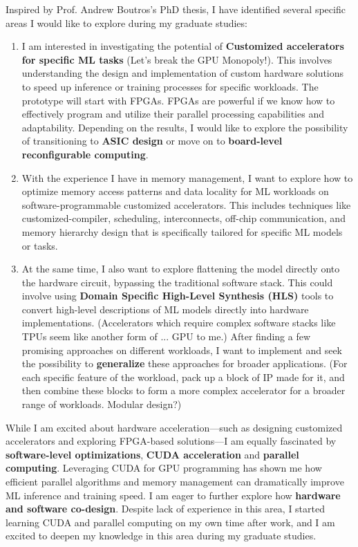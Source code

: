 \documentclass[a4 paper, 10pt]{article}
\begin{document}
Inspired by Prof. Andrew Boutros's PhD thesis, I have identified several specific areas I would like to explore during my graduate studies:
\begin{enumerate}
    \item I am interested in investigating the potential of \textbf{Customized accelerators for specific ML tasks} (Let's break the GPU Monopoly!). This involves understanding the design and implementation of {custom hardware solutions} to speed up inference or training processes for specific workloads. The prototype will start with {FPGAs}. FPGAs are powerful if we know how to effectively program and utilize their parallel processing capabilities and adaptability. Depending on the results, I would like to explore the possibility of transitioning to \textbf{ASIC design} or move on to \textbf{board-level reconfigurable computing}.
    \item With the experience I have in {memory management}, I want to explore how to optimize {memory access patterns} and {data locality} for ML workloads on software-programmable customized accelerators. This includes techniques like customized-compiler, scheduling, interconnects, off-chip communication, and memory hierarchy design that is specifically tailored for specific ML models or tasks.
    \item At the same time, I also want to explore flattening the model directly onto the {hardware circuit}, bypassing the traditional software stack. This could involve using \textbf{Domain Specific High-Level Synthesis (HLS)} tools to convert high-level descriptions of ML models directly into hardware implementations. (Accelerators which require complex software stacks like TPUs seem like another form of ... GPU to me.) After finding a few promising approaches on different workloads, I want to implement and seek the possibility to \textbf{generalize} these approaches for broader applications. (For each specific feature of the workload, pack up a block of {IP} made for it, and then combine these blocks to form a more complex accelerator for a broader range of workloads. Modular design?)
\end{enumerate}

While I am excited about hardware acceleration—such as designing customized accelerators and exploring FPGA-based solutions—I am equally fascinated by \textbf{software-level optimizations},  \textbf{CUDA acceleration} and \textbf{parallel computing}. Leveraging CUDA for GPU programming has shown me how efficient parallel algorithms and memory management can dramatically improve ML inference and training speed. I am eager to further explore how \textbf{hardware and software co-design}. Despite lack of experience in this area, I started learning CUDA and parallel computing on my own time after work, and I am excited to deepen my knowledge in this area during my graduate studies.
\end{document}
